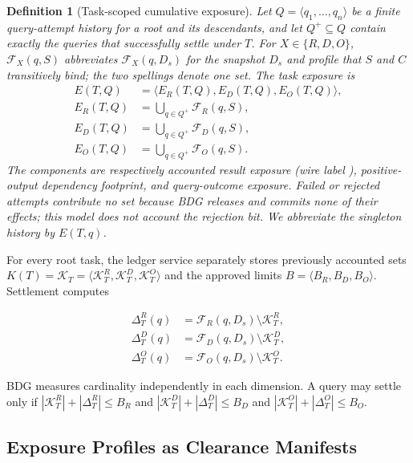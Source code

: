 \documentclass[10pt,journal,compsoc]{IEEEtran}
\newcommand{\code}[1]{\texttt{\detokenize{#1}}}
\newcommand{\facts}{\mathcal{F}}
\newcommand{\accounted}{\mathcal{K}}
\newtheorem{definition}{Definition}
\begin{document}
\begin{definition}[Task-scoped cumulative exposure]
\label{def:task-exposure}
Let $Q=\langle q_1,\ldots,q_n\rangle$ be a finite query-attempt history for a
root and its descendants, and let $Q^+\subseteq Q$ contain exactly the queries
that successfully settle under $T$. For $X\in\{R,D,O\}$,
$\facts_X(q,S)$ abbreviates $\facts_X(q,D_s)$ for the snapshot $D_s$ and
profile that $S$ and $C$ transitively bind; the two spellings denote one set.
The task exposure is
\begin{equation}
 \begin{aligned}
 E(T,Q)&=\langle E_R(T,Q),E_D(T,Q),E_O(T,Q)\rangle,\\
 E_R(T,Q)&=\bigcup_{q\in Q^+}\facts_R(q,S),\\
 E_D(T,Q)&=\bigcup_{q\in Q^+}\facts_D(q,S),\\
 E_O(T,Q)&=\bigcup_{q\in Q^+}\facts_O(q,S).
 \end{aligned}
 \label{eq:task-exposure}
\end{equation}
The components are respectively accounted result exposure (wire label
\code{release}), positive-output dependency
footprint, and query-outcome exposure. Failed or rejected attempts contribute
no set because BDG releases and commits none of their effects; this model
does not account the rejection bit. We abbreviate the singleton history by
$E(T,q)$.
\end{definition}

For every root task, the ledger service separately stores previously accounted
sets $K(T)=\accounted_T=\langle\accounted_T^R,\accounted_T^D,
\accounted_T^O\rangle$ and the approved limits
$B=\langle B_R,B_D,B_O\rangle$. Settlement computes

\begin{align}
 \Delta_T^R(q) &= \facts_R(q,D_s)\setminus\accounted_T^R,\\
 \Delta_T^D(q) &= \facts_D(q,D_s)\setminus\accounted_T^D,\\
 \Delta_T^O(q) &= \facts_O(q,D_s)\setminus\accounted_T^O.
 \label{eq:delta}
\end{align}

BDG measures cardinality independently in each dimension. A query may settle
only if
$|\accounted_T^R|+|\Delta_T^R|\leq B_R$ and
$|\accounted_T^D|+|\Delta_T^D|\leq B_D$ and
$|\accounted_T^O|+|\Delta_T^O|\leq B_O$.

\subsection{Exposure Profiles as Clearance Manifests}
\label{sec:clearance-profile}
\end{document}
